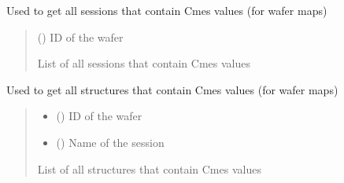 \documentclass[letterpaper,10pt,english]{sphinxmanual}
\begin{document}

\begin{fulllineitems}
\label{\detokenize{getter:getter.get_Cmes_sessions}}
\pysigstartsignatures
{}
\pysigstopsignatures
\sphinxAtStartPar
Used to get all sessions that contain Cmes values (for wafer maps)
\begin{quote}\begin{description}
\sphinxAtStartPar
{} () \textendash{} ID of the wafer

\sphinxAtStartPar
List of all sessions that contain Cmes values

\end{description}\end{quote}

\end{fulllineitems}


\begin{fulllineitems}
\label{\detokenize{getter:getter.get_Cmes_structures}}
\pysigstartsignatures
{}
\pysigstopsignatures
\sphinxAtStartPar
Used to get all structures that contain Cmes values (for wafer maps)
\begin{quote}\begin{description}
\begin{itemize}
\item {} 
\sphinxAtStartPar
{} () \textendash{} ID of the wafer

\item {} 
\sphinxAtStartPar
{} () \textendash{} Name of the session

\end{itemize}

\sphinxAtStartPar
List of all structures that contain Cmes values

\end{description}\end{quote}

\end{fulllineitems}
\end{document}
